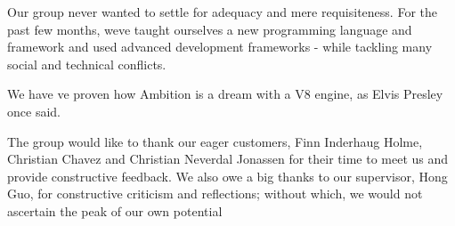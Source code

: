 Our group never wanted to settle for adequacy and mere requisiteness.
For the past few months, weve taught ourselves a new
programming language and framework and used advanced development
frameworks - while tackling many social and technical conflicts.


We have ve proven how Ambition is a dream
with a V8 engine, as Elvis Presley once said.


\bigskip


The group would like to thank our eager customers, Finn Inderhaug Holme,
Christian Chavez and Christian Neverdal Jonassen for their time to meet
us and provide constructive feedback. We also owe a big thanks to our
supervisor, Hong Guo, for constructive criticism and reflections;
without which, we would not ascertain the peak of our own potential
